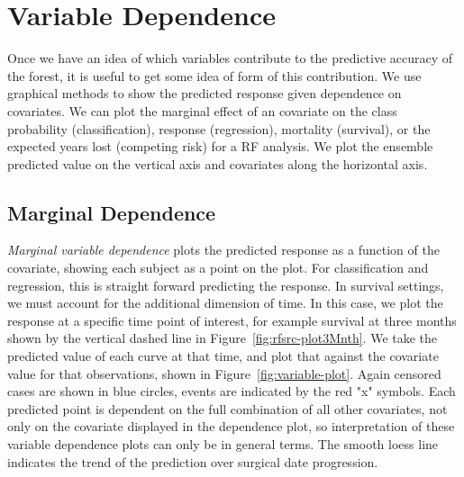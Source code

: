 \documentclass[nojss]{jss}
\begin{document}
\section{Variable Dependence}\label{S:dependence}
Once we have an idea of which variables contribute to the predictive accuracy of the forest, it is useful to get some idea of form of this contribution. We use graphical methods to show the predicted response given dependence on covariates. We can plot the marginal effect of an covariate on the class probability (classification), response (regression), mortality (survival), or the expected years lost (competing risk) for a RF analysis. We plot the ensemble predicted value on the vertical axis and covariates along the horizontal axis.

\subsection{Marginal Dependence}\label{S:variableDependence}
\emph{Marginal variable dependence} plots the predicted response as a function of the covariate, showing each subject as a point on the plot. For classification and regression, this is straight forward predicting the response. In survival settings, we must account for the additional dimension of time. In this case, we plot the response at a specific time point of interest, for example survival at three months shown by the vertical dashed line in Figure~\ref{fig:rfsrc-plot3Mnth}. We take the predicted value of each curve at that time, and plot that against the covariate value for that observations, shown in Figure~\ref{fig:variable-plot}. Again censored cases are shown in blue circles, events are indicated by the red "x" symbols. Each predicted point is dependent on the full combination of all other covariates, not only on the covariate displayed in the dependence plot, so interpretation of these variable dependence plots can only be in general terms. The smooth loess line~\citep{cleveland:1981, cleveland:1988} indicates the trend of the prediction over surgical date progression.
\end{document}
